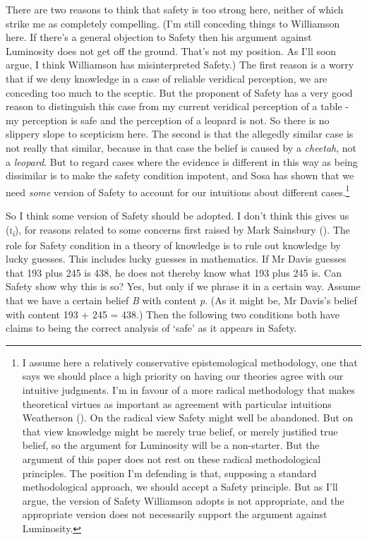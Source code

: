 \documentclass[
  10pt,
  letterpaper,
  DIV=11,
  numbers=noendperiod,
  twoside]{scrartcl}
\begin{document}
There are two reasons to think that safety is too strong here, neither
of which strike me as completely compelling. (I'm still conceding things
to Williamson here. If there's a general objection to Safety then his
argument against Luminosity does not get off the ground. That's not my
position. As I'll soon argue, I think Williamson has misinterpreted
Safety.) The first reason is a worry that if we deny knowledge in a case
of reliable veridical perception, we are conceding too much to the
sceptic. But the proponent of Safety has a very good reason to
distinguish this case from my current veridical perception of a table -
my perception is safe and the perception of a leopard is not. So there
is no slippery slope to scepticism here. The second is that the
allegedly similar case is not really that similar, because in that case
the belief is caused by a \emph{cheetah}, not a \emph{leopard}. But to
regard cases where the evidence is different in this way as being
dissimilar is to make the safety condition impotent, and Sosa has shown
that we need \emph{some} version of Safety to account for our intuitions
about different cases.\footnote{I assume here a relatively conservative
  epistemological methodology, one that says we should place a high
  priority on having our theories agree with our intuitive judgments.
  I'm in favour of a more radical methodology that makes theoretical
  virtues as important as agreement with particular intuitions
  Weatherson (). On the
  radical view Safety might well be abandoned. But on that view
  knowledge might be merely true belief, or merely justified true
  belief, so the argument for Luminosity will be a non-starter. But the
  argument of this paper does not rest on these radical methodological
  principles. The position I'm defending is that, supposing a standard
  methodological approach, we should accept a Safety principle. But as
  I'll argue, the version of Safety Williamson adopts is not
  appropriate, and the appropriate version does not necessarily support
  the argument against Luminosity.}

So I think some version of Safety should be adopted. I don't think this
gives us (\textsc{i}\textsubscript{\emph{i}}), for reasons related to
some concerns first raised by Mark Sainsbury
(). The role for Safety condition in a
theory of knowledge is to rule out knowledge by lucky guesses. This
includes lucky guesses in mathematics. If Mr Davis guesses that 193 plus
245 is 438, he does not thereby know what 193 plus 245 is. Can Safety
show why this is so? Yes, but only if we phrase it in a certain way.
Assume that we have a certain belief \emph{B} with content \emph{p}. (As
it might be, Mr Davis's belief with content 193 + 245 = 438.) Then the
following two conditions both have claims to being the correct analysis
of `safe' as it appears in Safety.
\end{document}
